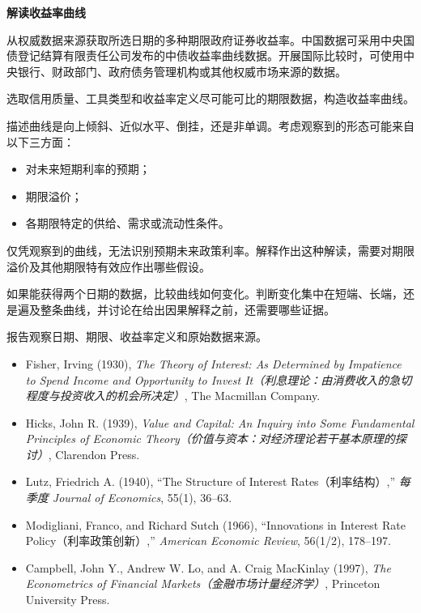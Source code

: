 
\textbf{解读收益率曲线}

从权威数据来源获取所选日期的多种期限政府证券收益率。中国数据可采用中央国债登记结算有限责任公司发布的中债收益率曲线数据。开展国际比较时，可使用中央银行、财政部门、政府债务管理机构或其他权威市场来源的数据。

选取信用质量、工具类型和收益率定义尽可能可比的期限数据，构造收益率曲线。

描述曲线是向上倾斜、近似水平、倒挂，还是非单调。考虑观察到的形态可能来自以下三方面：

\begin{itemize}

\item 对未来短期利率的预期；

\item 期限溢价；

\item 各期限特定的供给、需求或流动性条件。

\end{itemize}

仅凭观察到的曲线，无法识别预期未来政策利率。解释作出这种解读，需要对期限溢价及其他期限特有效应作出哪些假设。

如果能获得两个日期的数据，比较曲线如何变化。判断变化集中在短端、长端，还是遍及整条曲线，并讨论在给出因果解释之前，还需要哪些证据。

报告观察日期、期限、收益率定义和原始数据来源。



\begin{itemize}

\item Fisher, Irving (1930), \emph{The Theory of Interest: As Determined by Impatience to Spend Income and Opportunity to Invest It（利息理论：由消费收入的急切程度与投资收入的机会所决定）}, The Macmillan Company.

\item Hicks, John R. (1939), \emph{Value and Capital: An Inquiry into Some Fundamental Principles of Economic Theory（价值与资本：对经济理论若干基本原理的探讨）}, Clarendon Press.

\item Lutz, Friedrich A. (1940), ``The Structure of Interest Rates（利率结构）,'' \emph{每季度 Journal of Economics}, 55(1), 36--63.

\item Modigliani, Franco, and Richard Sutch (1966), ``Innovations in Interest Rate Policy（利率政策创新）,'' \emph{American Economic Review}, 56(1/2), 178--197.

\item Campbell, John Y., Andrew W. Lo, and A. Craig MacKinlay (1997), \emph{The Econometrics of Financial Markets（金融市场计量经济学）}, Princeton University Press.

\end{itemize}

